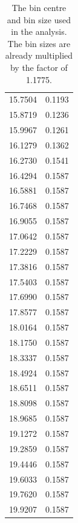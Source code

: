 \documentclass[fleqn,usenatbib]{mnras}
\begin{document}
\begin{table}
\begin{tabular}{c|c}
        15.7504 & 0.1193\\
        15.8719 & 0.1236\\
        15.9967 & 0.1261\\
        16.1279 & 0.1362\\
        16.2730 & 0.1541\\
        16.4294 & 0.1587\\
        16.5881 & 0.1587\\
        16.7468 & 0.1587\\\hline
        16.9055 & 0.1587\\
        17.0642 & 0.1587\\
        17.2229 & 0.1587\\
        17.3816 & 0.1587\\
        17.5403 & 0.1587\\
        17.6990 & 0.1587\\
        17.8577 & 0.1587\\
        18.0164 & 0.1587\\
        18.1750 & 0.1587\\
        18.3337 & 0.1587\\\hline
        18.4924 & 0.1587\\
        18.6511 & 0.1587\\
        18.8098 & 0.1587\\
        18.9685 & 0.1587\\
        19.1272 & 0.1587\\
        19.2859 & 0.1587\\
        19.4446 & 0.1587\\
        19.6033 & 0.1587\\
        19.7620 & 0.1587\\
        19.9207 & 0.1587\\\hline
            \end{tabular}
    \caption{The bin centre and bin size used in the analysis. The bin sizes are
    already multiplied by the factor of 1.1775.}
    \label{tab:magnitude_resolution}
\end{table}


\bsp	%
\label{lastpage}
\end{document}
